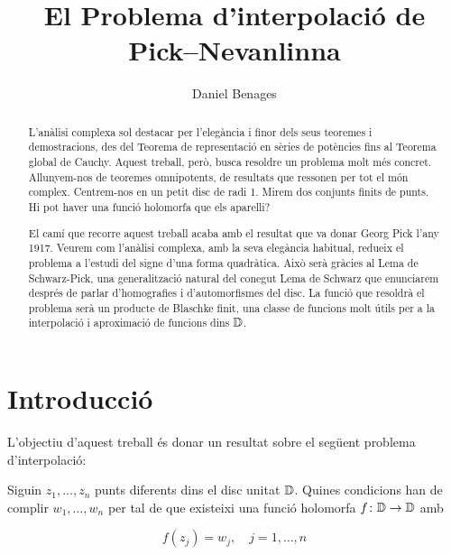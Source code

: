 \documentclass[dvipsnames, svgnames, leqno, a4paper, 12pt]{article}
\title{El Problema d'interpolació de Pick--Nevanlinna}
\date{}
\author{Daniel Benages}
\begin{document}
\tikzset{font=\scriptsize}
    \begin{titlepage}
      \maketitle

    \end{titlepage}
    \begin{abstract}
        L'anàlisi complexa sol destacar per l'elegància i finor dels seus teoremes i demostracions, des del Teorema de representació en sèries de potències fins al Teorema global de Cauchy. Aquest treball, però, busca resoldre un problema molt més concret. Allunyem-nos de teoremes omnipotents, de resultats que ressonen per tot el món complex. Centrem-nos en un petit disc de radi 1. Mirem dos conjunts finits de punts. Hi pot haver una funció holomorfa que els aparelli? 
        
        El camí que recorre aquest treball acaba amb el resultat que va donar Georg Pick l'any 1917. Veurem com l'anàlisi complexa, amb la seva elegància habitual, redueix el problema a l'estudi del signe d'una forma quadràtica. Això serà gràcies al Lema de Schwarz-Pick, una generalització natural del conegut Lema de Schwarz que enunciarem després de parlar d'homografies i d'automorfismes del disc. La funció que resoldrà el problema serà un producte de Blaschke finit, una classe de funcions molt útils per a la interpolació i aproximació de funcions dins $\mathbb{D}$.


    \end{abstract}
\newpage
\tableofcontents
\newpage
    \section{Introducció}
        L'objectiu d'aquest treball és donar un resultat sobre el següent problema d'interpolació:
        \begin{problem}\label{problema}
            Siguin $z_1,\dots,z_n$ punts diferents dins el disc unitat $\mathbb{D}$. Quines condicions han de complir $w_1,\dots,w_n$ per tal de que existeixi una funció holomorfa $f\colon\mathbb{D}\to\mathbb{D}$ amb
            
            \begin{equation}
                f(z_j)=w_j,\quad j=1,\dots,n
            \end{equation}
            
        \end{problem}
\end{document}
